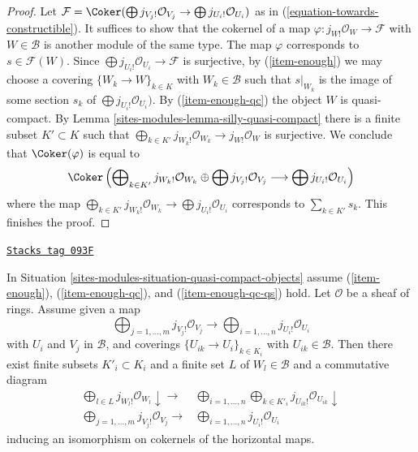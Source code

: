 \begin{proof}
Let $\mathcal{F} = \Coker(\bigoplus j_{V_j!}\mathcal{O}_{V_j} \to
\bigoplus j_{U_i!}\mathcal{O}_{U_i})$
as in (\ref{equation-towards-constructible}). It suffices to show
that the cokernel of a map $\varphi : j_{W!}\mathcal{O}_W \to \mathcal{F}$
with $W \in \mathcal{B}$ is another module of the same type.
The map $\varphi$ corresponds to $s \in \mathcal{F}(W)$.
Since $\bigoplus j_{U_i!}\mathcal{O}_{U_i} \to \mathcal{F}$ is
surjective, by (\ref{item-enough}) we may choose a covering
$\{W_k \to W\}_{k \in K}$ with $W_k \in \mathcal{B}$
such that $s|_{W_k}$ is the image of some section
$s_k$ of $\bigoplus j_{U_i!}\mathcal{O}_{U_i})$.
By (\ref{item-enough-qc}) the object $W$ is quasi-compact.
By Lemma \ref{sites-modules-lemma-silly-quasi-compact}
there is a finite subset $K' \subset K$ such that
$\bigoplus_{k \in K'} j_{W_k!}\mathcal{O}_{W_k} \to j_{W!}\mathcal{O}_W$
is surjective. We conclude that $\Coker(\varphi)$ is equal to
$$
\Coker\left(
\bigoplus\nolimits_{k \in K'} j_{W_k!}\mathcal{O}_{W_k} \oplus
\bigoplus j_{V_j!}\mathcal{O}_{V_j}
\longrightarrow
\bigoplus j_{U_i!}\mathcal{O}_{U_i}
\right)
$$
where the map $\bigoplus_{k \in K'} j_{W_k!}\mathcal{O}_{W_k}
\to \bigoplus j_{U_i!}\mathcal{O}_{U_i}$ corresponds to
$\sum_{k \in K'} s_k$. This finishes the proof.
\end{proof}

\begin{lemma}
\label{sites-modules-lemma-change-presentation-towards-constructibles}
\href{https://stacks.math.columbia.edu/tag/093F}{\texttt{Stacks tag 093F}}

In Situation \ref{sites-modules-situation-quasi-compact-objects} assume
(\ref{item-enough}), (\ref{item-enough-qc}), and (\ref{item-enough-qc-qs})
hold. Let $\mathcal{O}$ be a sheaf of rings. Assume given a map
$$
\bigoplus\nolimits_{j = 1, \ldots, m} j_{V_j!}\mathcal{O}_{V_j}
\longrightarrow
\bigoplus\nolimits_{i = 1, \ldots, n} j_{U_i!}\mathcal{O}_{U_i}
$$
with $U_i$ and $V_j$ in $\mathcal{B}$, and coverings
$\{U_{ik} \to U_i\}_{k \in K_i}$ with $U_{ik} \in \mathcal{B}$.
Then there exist finite subsets $K'_i \subset K_i$ and
a finite set $L$ of $W_l \in \mathcal{B}$ and a commutative diagram
$$
\begin{array}{cc}\bigoplus_{l \in L} j_{W_l!}\mathcal{O}_{W_l} \downarrow\longrightarrow & \bigoplus_{i = 1, \ldots, n} \bigoplus_{k \in K'_i}
j_{U_{ik}!}\mathcal{O}_{U_{ik}} \downarrow \\ \bigoplus_{j = 1, \ldots, m} j_{V_j!}\mathcal{O}_{V_j} \longrightarrow & \bigoplus_{i = 1, \ldots, n} j_{U_i!}\mathcal{O}_{U_i}\end{array}
$$
inducing an isomorphism on cokernels of the horizontal maps.
\end{lemma}

